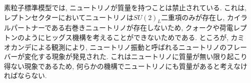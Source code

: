 %
素粒子標準模型では, ニュートリノが質量を持つことは禁止されている.
これは, レプトンセクターにおいてニュートリノは$SU(2)_L$二重項のみが存在し, カイラルパートナーである右巻きニュートリノが存在しないため, クォークや荷電レプトンのようにヒッグス機構を考えることができないためである.
ところが, カミオカンデによる観測により, ニュートリノ振動と呼ばれるニュートリノのフレーバーが変化する現象が発見された\cite{collaborationDirectEvidenceNeutrino2002,collaborationEvidenceOscillationAtmospheric1998,collaborationFirstResultsKamLAND2003}.
これはニュートリノに質量が無い限り起こり得ない現象である\cite{pontecorvoNeutrinoExperimentsProblem1967,makiRemarksUnifiedModel1962}ため, 何らかの機構でニュートリノにも質量があると考えなければならない.

